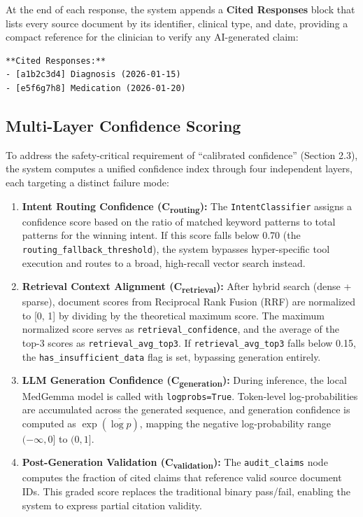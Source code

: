 At the end of each response, the system appends a \textbf{Cited Responses} block that lists every source document by its identifier, clinical type, and date, providing a compact reference for the clinician to verify any AI-generated claim:

\begin{verbatim}
**Cited Responses:**
- [a1b2c3d4] Diagnosis (2026-01-15)
- [e5f6g7h8] Medication (2026-01-20)
\end{verbatim}

\subsection{Multi-Layer Confidence Scoring}
\label{subsec:confidence}
To address the safety-critical requirement of ``calibrated confidence'' (Section 2.3), the system computes a unified confidence index through four independent layers, each targeting a distinct failure mode:

\begin{enumerate}
    \item \textbf{Intent Routing Confidence (C\textsubscript{routing}):} The \texttt{IntentClassifier} assigns a confidence score based on the ratio of matched keyword patterns to total patterns for the winning intent. If this score falls below 0.70 (the \texttt{routing\_fallback\_threshold}), the system bypasses hyper-specific tool execution and routes to a broad, high-recall vector search instead.

    \item \textbf{Retrieval Context Alignment (C\textsubscript{retrieval}):} After hybrid search (dense + sparse), document scores from Reciprocal Rank Fusion (RRF) are normalized to [0, 1] by dividing by the theoretical maximum score. The maximum normalized score serves as \texttt{retrieval\_confidence}, and the average of the top-3 scores as \texttt{retrieval\_avg\_top3}. If \texttt{retrieval\_avg\_top3} falls below 0.15, the \texttt{has\_insufficient\_data} flag is set, bypassing generation entirely.

    \item \textbf{LLM Generation Confidence (C\textsubscript{generation}):} During inference, the local MedGemma model is called with \texttt{logprobs=True}. Token-level log-probabilities are accumulated across the generated sequence, and generation confidence is computed as $\exp(\overline{\log p})$, mapping the negative log-probability range $(-\infty, 0]$ to $(0, 1]$.

    \item \textbf{Post-Generation Validation (C\textsubscript{validation}):} The \texttt{audit\_claims} node computes the fraction of cited claims that reference valid source document IDs. This graded score replaces the traditional binary pass/fail, enabling the system to express partial citation validity.
\end{enumerate}

